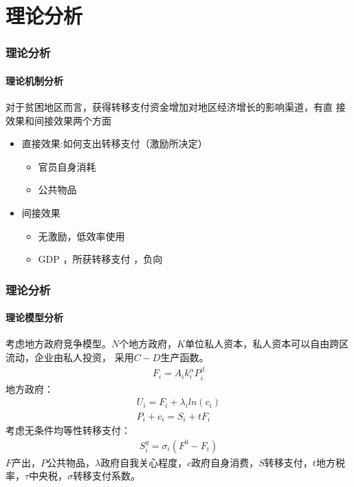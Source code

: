 \section{理论分析} 

\begin{frame}[t]
\frametitle{理论分析}
\framesubtitle{理论机制分析}

对于贫困地区而言，获得转移支付资金增加对地区经济增长的影响渠道，有直
接效果和间接效果两个方面
\begin{itemize}
	\item 直接效果:如何支出转移支付（激励所决定）
		\begin{itemize}
			\item 官员自身消耗
			\item 公共物品
		\end{itemize}
	\item 间接效果
		\begin{itemize}
			\item 无激励，低效率使用
			\item GDP \textuparrow ，所获转移支付 \textdownarrow ，负向
		\end{itemize}
\end{itemize}
\end{frame}








\begin{frame}[t]
	\frametitle{理论分析}
	\framesubtitle{理论模型分析}
	\begin{small}

	考虑地方政府竞争模型。$N$个地方政府，$K$单位私人资本，私人资本可以自由跨区流动，企业由私人投资，
	采用$C-D$生产函数。
	\begin{align}
	F_i=A_ik_i^\alpha P_i^\beta
	\end{align}
	地方政府：
	\begin{align}
	U_i = F_i+\lambda _i ln(c_i)\\
	P_i+c_i = S_i+tF_i
	\end{align}
	考虑无条件均等性转移支付：
	\begin{align}
	S_i^g=\sigma_i (F^0-F_i)
	\end{align}
	$F$产出，$P$公共物品，$\lambda$政府自我关心程度，$c$政府自身消费，$S$转移支付，$t$地方税率，$\tau$中央税，$\sigma$转移支付系数。
	\end{small}
\end{frame}

